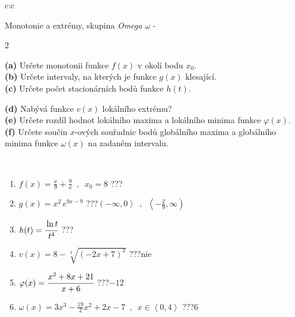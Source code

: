 \documentclass[10pt]{report}
\begin{document}
\newpage
\thispagestyle{empty}
\begin{tabular}{c:c}
\begin{minipage}[c][104.5mm][t]{0.5\linewidth}
\begin{center}
\vspace{7mm}
{\huge Monotonie a extrémy, skupina \textit{Omega $\omega$} -}\\[5mm]
\begin{minipage}{0.95\linewidth}
\begin{center}
{\small \begin{multicols}{2} \raggedright
\textbf{(a)} Určete monotonii funkce \(f(x)\) v okolí bodu \(x_0\). \\[1mm]
\textbf{(b)} Určete intervaly, na kterých je funkce \(g(x)\) klesající. \\[1mm]
\textbf{(c)} Určete počet stacionárních bodů funkce \(h(t)\). \par \columnbreak
\textbf{(d)} Nabývá funkce \(v(x)\) lokálního extrému? \\[1mm]
\textbf{(e)} Určete rozdíl hodnot lokálního maxima a lokálního minima funkce \(\varphi(x)\). \\[1mm]
\textbf{(f)} Určete součin \(x\)-ových souřadnic bodů globálního maxima a globálního minima funkce \(\omega(x)\) na zadaném intervalu. \\[1mm]
\end{multicols}
}
\end{center}
\end{minipage}
\\[4mm]
\begin{minipage}{0.79\linewidth}
\begin{center}
\begin{varwidth}{\linewidth}
\begin{enumerate}
\normalsize
\item $f(x)=\frac{x}{9}+\frac{9}{x} \enspace , \enspace x_0=8$\quad \dotfill\; ???\;\dotfill \quad {}
\item $g(x)=x^2\, e^{9x-9}$\quad \dotfill\; ???\;\dotfill \quad $\left(-\infty , 0\right\rangle\enspace , \enspace \left\langle-\frac{2}{9} , \infty\right)$
\item $h(t)=\cfrac{\ln t}{t^4}$\quad \dotfill\; ???\;\dotfill {}
\item $v(x)=8-\sqrt[3]{(-2x+7)^2}$\quad \dotfill\; ???\;\dotfill \quad $\text{nie}$
\item $\varphi(x)=\cfrac{x^2+8x+21}{x+6}$\quad \dotfill\; ???\;\dotfill \quad $-12$
\item $\omega(x)=3x^3-\frac{19}{2}x^2+2x-7 \enspace , \enspace x\in\left\langle0 , 4\right\rangle$\quad \dotfill\; ???\;\dotfill \quad $6$

\end{enumerate}
\end{varwidth}
\end{center}
\end{minipage}
\end{center}
\end{minipage}
\end{tabular}
\end{document}
